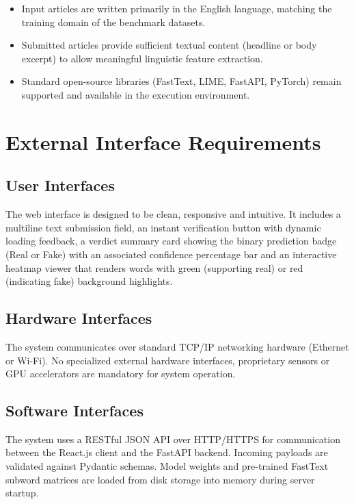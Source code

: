 \documentclass[12pt,a4paper,oneside]{report}
\begin{document}
\begin{itemize}[leftmargin=*, itemsep=2pt]
  \item Input articles are written primarily in the English language, matching the training domain
        of the benchmark datasets.
  \item Submitted articles provide sufficient textual content (headline or body excerpt) to allow
        meaningful linguistic feature extraction.
  \item Standard open-source libraries (FastText, LIME, FastAPI, PyTorch) remain supported and
        available in the execution environment.
\end{itemize}

\section{External Interface Requirements}

\subsection{User Interfaces}

The web interface is designed to be clean, responsive and intuitive. It includes a multiline text
submission field, an instant verification button with dynamic loading feedback, a verdict summary
card showing the binary prediction badge (Real or Fake) with an associated confidence percentage bar
and an interactive heatmap viewer that renders words with green (supporting real) or red
(indicating fake) background highlights.

\subsection{Hardware Interfaces}

The system communicates over standard TCP/IP networking hardware (Ethernet or Wi-Fi). No
specialized external hardware interfaces, proprietary sensors or GPU accelerators are mandatory for
system operation.

\subsection{Software Interfaces}

The system uses a RESTful JSON API over HTTP/HTTPS for communication between the React.js client and
the FastAPI backend. Incoming payloads are validated against Pydantic schemas. Model weights and
pre-trained FastText subword matrices are loaded from disk storage into memory during server startup.
\end{document}
